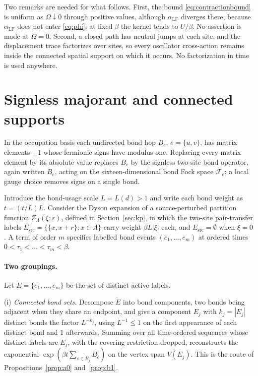 \documentclass[11pt]{article}
\theoremstyle{plain}
\theoremstyle{definition}
\begin{document}
Two remarks are needed for what follows. First, the bound \eqref{eq:contractionbound} is
uniform as $\Omega\downarrow0$ through positive values, although $\alpha_{\mathrm{LF}}$
diverges there, because $\alpha_{\mathrm{LF}}$ does not enter \eqref{eq:phi}; at
fixed $\beta$ the kernel tends to $U/\beta$. No assertion is made at $\Omega=0$.
Second, a closed path has neutral jumps at each site, and the displacement trace
factorizes over sites, so every oscillator cross-action remains inside the connected
spatial support on which it occurs. No factorization in time is used anywhere.

\section{Signless majorant and connected supports}\label{sec:supports}

In the occupation basis each undirected bond hop $B_e$, $e=\{u,v\}$, has matrix
elements $\pm1$ whose fermionic signs have modulus one. Replacing every matrix
element by its absolute value replaces $B_e$ by the signless two-site bond operator,
again written $B_e$, acting on the sixteen-dimensional bond Fock space $\mathcal F_e$;
a local gauge choice removes signs on a single bond.

Introduce the bond-usage scale $L=L(d)>1$ and write each bond weight as
$t=(t/L)L$. Consider the Dyson expansion of a source-perturbed partition function
$Z_\Lambda(\xi;r)$, defined in Section~\ref{sec:kp}, in which the two-site
pair-transfer labels $E_{\mathrm{src}}=\{\{x,x+r\}:x\in\Lambda\}$ carry weight
$\beta L|\xi|$ each, and $E_{\mathrm{src}}=\emptyset$ when $\xi=0$. A term of order
$m$ specifies labelled bond events $(e_1,\dots,e_m)$ at ordered times
$0<\tau_1<\dots<\tau_m<\beta$.

\paragraph{Two groupings.}
Let $\widetilde E=\{e_1,\dots,e_m\}$ be the set of distinct active labels.

(i) \emph{Connected bond sets.} Decompose $\widetilde E$ into bond components, two
bonds being adjacent when they share an endpoint, and give a component $E_j$ with
$k_j=|E_j|$ distinct bonds the factor $L^{-k_j}$, using $L^{-1}\le1$ on the first
appearance of each distinct bond and $1$ afterwards. Summing over all time-ordered
sequences whose distinct labels are $E_j$, with the covering restriction dropped,
reconstructs the exponential $\exp(\beta t\sum_{e\in E_j}B_e)$ on the vertex span
$V(E_j)$. This is the route of Propositions~\ref{prop:a0} and~\ref{prop:b1}.
\end{document}
